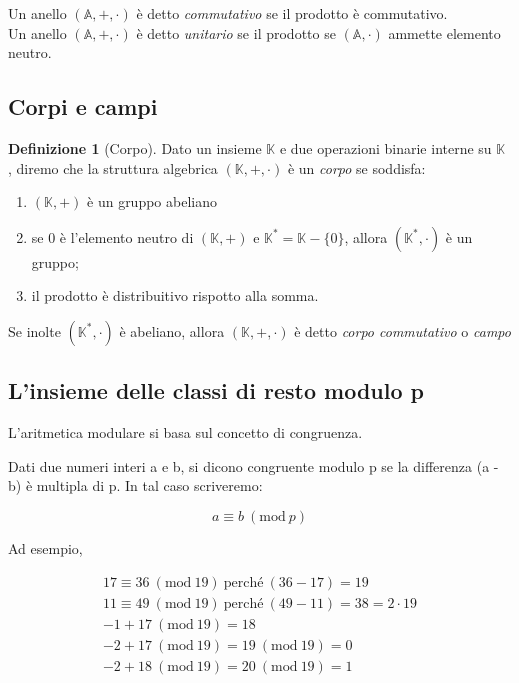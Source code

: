 \documentclass{book}
\theoremstyle{definition}
\newtheorem{definizione}{Definizione}
\newcommand{\Mod}[1]{\ (\mathrm{mod}\ #1)}
\newcommand{\An}{\mathbb{A}}
\newcommand{\Anello}{(\An, +, \per)}
\newcommand{\per}{\cdot}
\begin{document}
Un anello $\Anello$ è detto \emph{commutativo} se il prodotto è commutativo.\\
Un anello $\Anello$ è detto \emph{unitario} se il prodotto se $(\mathbb{A}, \per)$ ammette elemento neutro.

\subsection{Corpi e campi}

\begin{definizione}[Corpo]
    Dato un insieme $\mathbb{K}$ e due operazioni binarie interne su $\mathbb{K}$ , diremo che la struttura algebrica $(\mathbb{K} , +, \cdot)$ è un \textit{corpo} se soddisfa:
    \begin{enumerate}[label=(K\arabic*.),itemindent=*]
        \item $(\mathbb{K}, +)$ è un gruppo abeliano
        \item se 0 è l'elemento neutro di $(\mathbb{K}, +)$ e $\mathbb{K}^{*} = \mathbb{K} - \{0\}$, allora $(\mathbb{K}^{*}, \per)$ è un gruppo;
        \item il prodotto è distribuitivo rispotto alla somma.    
    \end{enumerate}

    Se inolte $(\mathbb{K}^{*}, \per)$ è abeliano, allora $(\mathbb{K} , +, \cdot)$ è detto \emph{corpo commutativo} o \emph{campo}
\end{definizione}

\subsection{L'insieme delle classi di resto modulo p}

L'aritmetica modulare si basa sul concetto di congruenza.

Dati due numeri interi a e b, si dicono congruente modulo p se la differenza (a - b) è multipla di p. In tal caso scriveremo:

$$
a \equiv b \Mod{p}
$$

Ad esempio, 

\begin{align*}
    17 \equiv 36 \Mod{19} \ \text{perché} \ (36 - 17) = 19 \\
    11 \equiv 49 \Mod{19} \ \text{perché} \ (49 - 11) = 38 = 2 \cdot 19 \\
    -1 + 17 \Mod{19} = 18 \\
    -2 + 17 \Mod{19} = 19 \Mod{19} = 0 \\
    -2 + 18 \Mod{19} = 20 \Mod{19} = 1
\end{align*}
\end{document}
